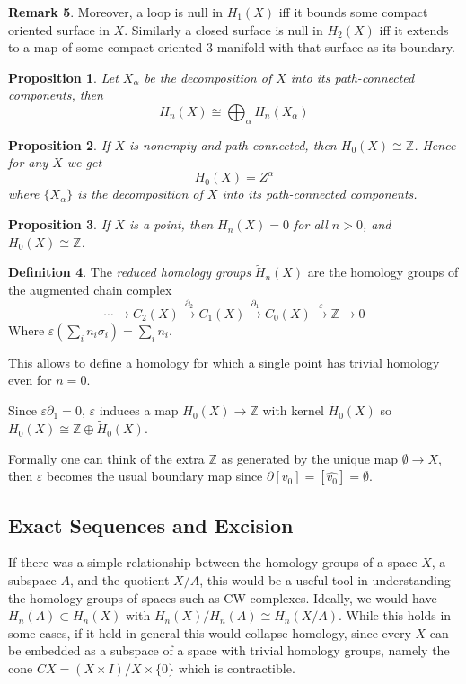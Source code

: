 \documentclass[11pt,a4paper]{article}
\theoremstyle{definition}
\newtheorem{definition}{Definition}[section]
\newtheorem{remark}[definition]{Remark}
\theoremstyle{plain}
\newtheorem{proposition}[definition]{Proposition}
\theoremstyle{remark}
\begin{document}
\begin{remark}
Moreover, a loop is null in $H_1(X)$ iff it bounds some compact oriented surface in $X$. Similarly
a closed surface is null in $H_2(X)$ iff it extends to a map of some compact oriented $3$-manifold with that surface as its boundary.

\begin{proposition}
  Let $X_\alpha$ be the decomposition of $X$ into its path-connected components, then 
  $$H_n(X) \cong \bigoplus_\alpha H_n(X_\alpha)$$
\end{proposition}

\begin{proposition}
  If $X$ is nonempty and path-connected, then $H_0(X) \cong \mathbb{Z}$. 
  Hence for any $X$ we get 
  $$H_0(X) = Z^\alpha$$
  where $\{X_\alpha\}$ is the decomposition of $X$ into its path-connected components.
\end{proposition}

\begin{proposition}
  If $X$ is a point, then $H_n(X) = 0$ for all $n > 0$, and $H_0(X) \cong \mathbb{Z}$. 
\end{proposition}

\begin{definition}
  The \emph{reduced homology groups} $\tilde{H}_n (X)$ are the homology groups of the augmented chain complex 
  $$\cdots \rightarrow C_2(X) \xrightarrow{\partial_2} C_1 (X) \xrightarrow{\partial_1} C_0 (X) \xrightarrow{\varepsilon} \mathbb{Z} \rightarrow 0$$
  Where $\varepsilon \left(\sum_i n_i \sigma_i\right) = \sum_i n_i$. 
\end{definition}
This allows to define a homology for which a single point has trivial homology even for $n = 0$. 

Since $\varepsilon \partial_1 = 0$, $\varepsilon$ induces a map $H_0(X) \to \mathbb{Z}$ with kernel 
$\tilde{H}_0(X)$ so $H_0(X) \cong \mathbb{Z} \oplus \tilde{H}_0(X)$. 

Formally one can think of the extra $\mathbb{Z}$ as generated by the unique map $\emptyset \to X$, then $\varepsilon$ becomes the usual boundary 
map since $\partial[v_0] = [\hat{v_0}] = \emptyset$. 

\subsection{Exact Sequences and Excision} 

If there was a simple relationship between the homology groups of a space $X$, a subspace $A$, 
and the quotient $X / A$, this would be a useful tool in understanding the homology groups 
of spaces such as CW complexes. 
Ideally, we would have $H_n(A) \subset H_n(X)$ with $H_n(X) / H_n(A) \cong H_n(X/A)$.
While this holds in some cases, if it held in general this would collapse homology, since 
every $X$ can be embedded as a subspace of a space with trivial homology groups, 
namely the cone $CX = (X \times I) / X \times \{0\}$ which is contractible. 


\end{remark}
\end{document}
